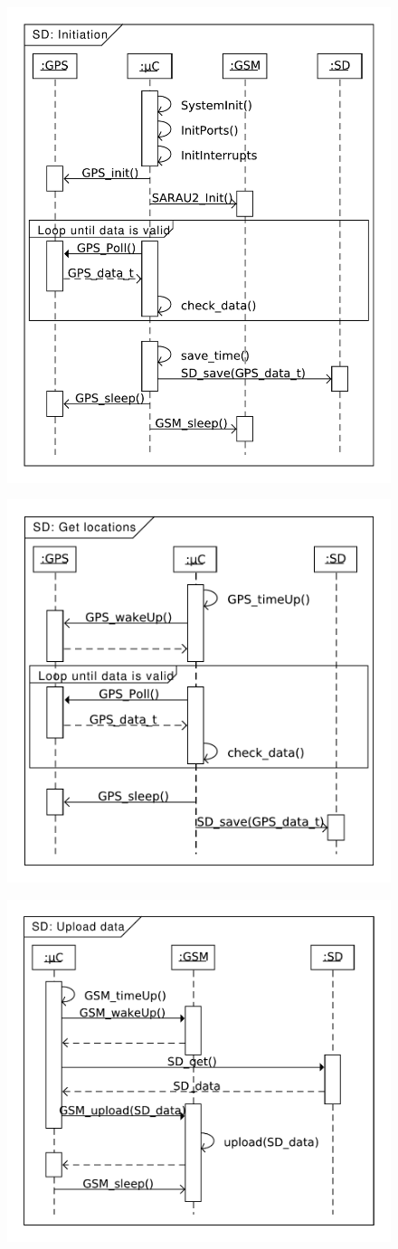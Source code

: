 \begin{figure}
	\centering
	\includegraphics[width=0.7\linewidth]{gfx/Design/SD_init.pdf}
	\caption{}
	\label{fig:SD:init}
\end{figure}

\begin{figure}
	\centering
	\includegraphics[width=0.7\linewidth]{gfx/Design/SD_getLocation.pdf}
	\caption{}
	\label{fig:SD:getlocation}
\end{figure}

\begin{figure}
	\centering
	\includegraphics[width=0.7\linewidth]{gfx/Design/SD_Upload.pdf}
	\caption{}
	\label{fig:SD:upload}
\end{figure}



\FloatBarrier